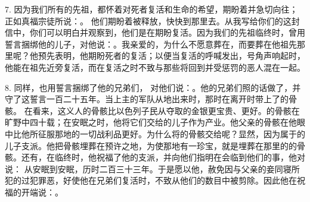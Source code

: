 7. 因为我们所有的先祖，都怀着对死者复活和生命的希望，期盼着并急切向往；正如真福宗徒所说：。 他们期盼着被释放，快快到那里去。从我写给你们的这封信中，你们可以明白并观察到，他们是在期盼复活。因为我们的先祖临终时，曾用誓言捆绑他的儿子，对他说：。我亲爱的，为什么不愿意葬在，而要葬在他祖先那里呢？他预先表明，他期盼死者的复活；以便当复活的呼喊发出，号角声响起时，他能在祖先近旁复活，而在复活之时不致与那些将回到并受惩罚的恶人混在一起。\par

8. 同样，也用誓言捆绑了他的兄弟们， 对他们说：。他的兄弟们照的话做了，并守了这誓言一百二十五年。当上主的军队从地出来时，那时在离开时带上了的骨骸。 在看来，这义人的骨骸比以色列子民从夺取的金银更宝贵、更好。的骨骸在旷野中四十载；在安眠之时，他将它们交给的儿子作为产业。他父亲的骨骸在他眼中比他所征服那地的一切战利品更好。为什么将的骨骸交给呢？显然，因为属于的儿子支派。他把骨骸埋葬在预许之地，为使那地有一珍宝，就是埋葬在那里的的骨骸。还有，在临终时，他祝福了他的支派，并向他们指明在会临到他们的事，他对说：  从安眠到安眠，历时二百三十三年。于是愿以他，赦免因与父亲的妾同寝所犯的过犯罪恶，好使他在兄弟们复活时，不致从他们的数目中被剪除。因此他在祝福的开端说：。\par

